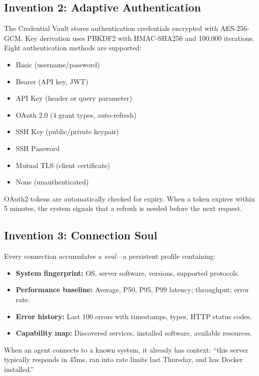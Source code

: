 \documentclass[10pt,twocolumn]{article}
\begin{document}
\subsection{Invention 2: Adaptive Authentication}

The Credential Vault stores authentication credentials encrypted with AES-256-GCM. Key derivation uses PBKDF2 with HMAC-SHA256 and 100,000 iterations. Eight authentication methods are supported:

\begin{itemize}
    \item Basic (username/password)
    \item Bearer (API key, JWT)
    \item API Key (header or query parameter)
    \item OAuth 2.0 (4 grant types, auto-refresh)
    \item SSH Key (public/private keypair)
    \item SSH Password
    \item Mutual TLS (client certificate)
    \item None (unauthenticated)
\end{itemize}

OAuth2 tokens are automatically checked for expiry. When a token expires within 5 minutes, the system signals that a refresh is needed before the next request.

\subsection{Invention 3: Connection Soul}

Every connection accumulates a \textit{soul}—a persistent profile containing:

\begin{itemize}
    \item \textbf{System fingerprint:} OS, server software, versions, supported protocols.
    \item \textbf{Performance baseline:} Average, P50, P95, P99 latency; throughput; error rate.
    \item \textbf{Error history:} Last 100 errors with timestamps, types, HTTP status codes.
    \item \textbf{Capability map:} Discovered services, installed software, available resources.
\end{itemize}

When an agent connects to a known system, it already has context: ``this server typically responds in 45ms, ran into rate limits last Thursday, and has Docker installed.''
\end{document}
